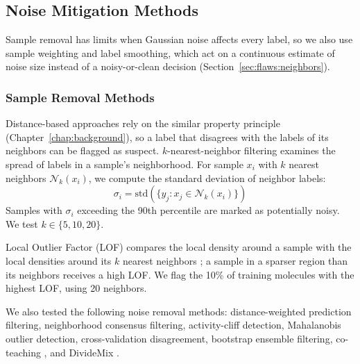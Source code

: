 \subsection{Noise Mitigation Methods}

Sample removal has limits when Gaussian noise affects every label, so we also use sample weighting and label smoothing, which act on a continuous estimate of noise size instead of a noisy-or-clean decision (Section~\ref{sec:flaws:neighbors}).

\subsubsection{Sample Removal Methods}

Distance-based approaches rely on the similar property principle (Chapter~\ref{chap:background}), so a label that disagrees with the labels of its neighbors can be flagged as suspect. $k$-nearest-neighbor filtering examines the spread of labels in a sample's neighborhood. For sample $x_i$ with $k$ nearest neighbors $\mathcal{N}_k(x_i)$, we compute the standard deviation of neighbor labels:
\begin{equation}
\sigma_i = \text{std}(\{y_j : x_j \in \mathcal{N}_k(x_i)\})
\end{equation}
Samples with $\sigma_i$ exceeding the 90th percentile are marked as potentially noisy. We test $k \in \{5, 10, 20\}$.

Local Outlier Factor (LOF) compares the local density around a sample with the local densities around its $k$ nearest neighbors \citep{Breunig2000}; a sample in a sparser region than its neighbors receives a high LOF. We flag the 10\% of training molecules with the highest LOF, using 20 neighbors. %

We also tested the following noise removal methods: distance-weighted prediction filtering, neighborhood consensus filtering, activity-cliff detection, Mahalanobis outlier detection, cross-validation disagreement, bootstrap ensemble filtering, co-teaching \citep{Han2018}, and DivideMix \citep{li2020dividemix}.

